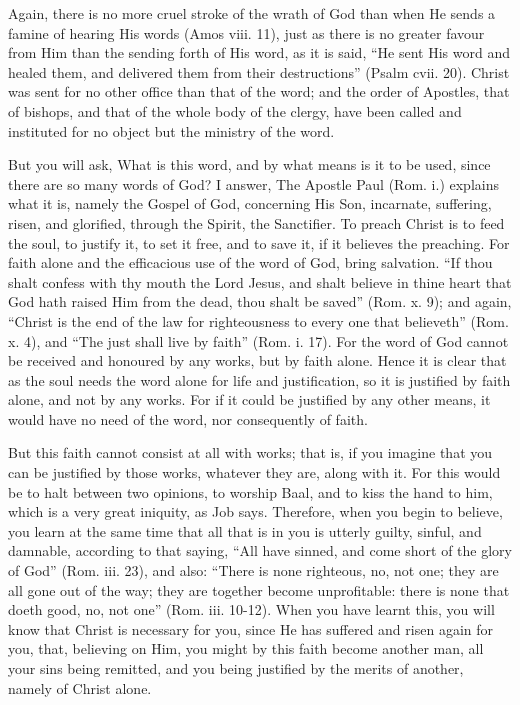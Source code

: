 Again, there is no more cruel stroke of the wrath of God than when He
sends a famine of hearing His words (Amos viii. 11), just as there is no
greater favour from Him than the sending forth of His word, as it is said,
``He sent His word and healed them, and delivered them from their
destructions'' (Psalm cvii. 20). Christ was sent for no other office than
that of the word; and the order of Apostles, that of bishops, and that of
the whole body of the clergy, have been called and instituted for no
object but the ministry of the word.

But you will ask, What is this word, and by what means is it to be used,
since there are so many words of God? I answer, The Apostle Paul (Rom. i.)
explains what it is, namely the Gospel of God, concerning His Son,
incarnate, suffering, risen, and glorified, through the Spirit, the
Sanctifier. To preach Christ is to feed the soul, to justify it, to set it
free, and to save it, if it believes the preaching. For faith alone and
the efficacious use of the word of God, bring salvation. ``If thou shalt
confess with thy mouth the Lord Jesus, and shalt believe in thine heart
that God hath raised Him from the dead, thou shalt be saved'' (Rom. x. 9);
and again, ``Christ is the end of the law for righteousness to every one
that believeth'' (Rom. x. 4), and ``The just shall live by faith'' (Rom. i.
17). For the word of God cannot be received and honoured by any works, but
by faith alone. Hence it is clear that as the soul needs the word alone
for life and justification, so it is justified by faith alone, and not by
any works. For if it could be justified by any other means, it would have
no need of the word, nor consequently of faith.

But this faith cannot consist at all with works; that is, if you imagine
that you can be justified by those works, whatever they are, along with
it. For this would be to halt between two opinions, to worship Baal, and
to kiss the hand to him, which is a very great iniquity, as Job says.
Therefore, when you begin to believe, you learn at the same time that all
that is in you is utterly guilty, sinful, and damnable, according to that
saying, ``All have sinned, and come short of the glory of God'' (Rom. iii.
23), and also: ``There is none righteous, no, not one; they are all gone
out of the way; they are together become unprofitable: there is none that
doeth good, no, not one'' (Rom. iii. 10-12). When you have learnt this, you
will know that Christ is necessary for you, since He has suffered and
risen again for you, that, believing on Him, you might by this faith
become another man, all your sins being remitted, and you being justified
by the merits of another, namely of Christ alone.

